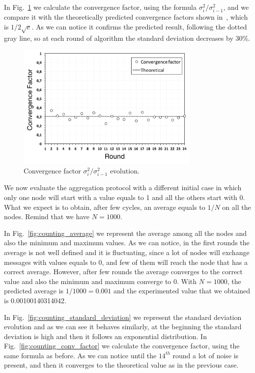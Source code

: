 In Fig.~\ref{fig:aggregation_conv_factor} we calculate the convergence factor, using the formula $\sigma_i^2 / \sigma_{i-1}^2$, and we compare it with the theoretically predicted convergence factors shown in~\cite{aggregation}, which is $1 / 2\sqrt{e}$. As we can notice it confirms the predicted result, following the dotted gray line, so at each round of algorithm the standard deviation decreases by 30\%.

\begin{figure}[ht]
  \centering
  \includegraphics[keepaspectratio=true, width=0.8\textwidth]{images/aggregation_conv_factor}\caption{Convergence factor $\sigma_i^2 / \sigma_{i-1}^2$ evolution.}
  \label{fig:aggregation_conv_factor}
\end{figure}


\newpage
We now evaluate the aggregation protocol with a different initial case in which only one node will start with a value equals to 1 and all the others start with 0. What we expect is to obtain, after few cycles, an average equals to $1/N$ on all the nodes. Remind that we have $N = 1000$.

In Fig.~\ref{fig:counting_average} we represent the average among all the nodes and also the minimum and maximum values. As we can notice, in the first rounds the average is not well defined and it is fluctuating, since a lot of nodes will exchange messages with values equals to 0, and few of them will reach the node that has a correct average. However, after few rounds the average converges to the correct value and also the minimum and maximum converge to 0. With $N = 1000$, the predicted average is $1 / 1000 = 0.001$ and the experimented value that we obtained is 0.00100140314042.

In Fig.~\ref{fig:counting_standard_deviation} we represent the standard deviation evolution and as we can see it behaves similarly, at the beginning the standard deviation is high and then it follows an exponential distribution. In Fig.~\ref{fig:counting_conv_factor} we calculate the convergence factor, using the same formula as before. As we can notice until the $14^{th}$ round a lot of noise is present, and then it converges to the theoretical value as in the previous case.

